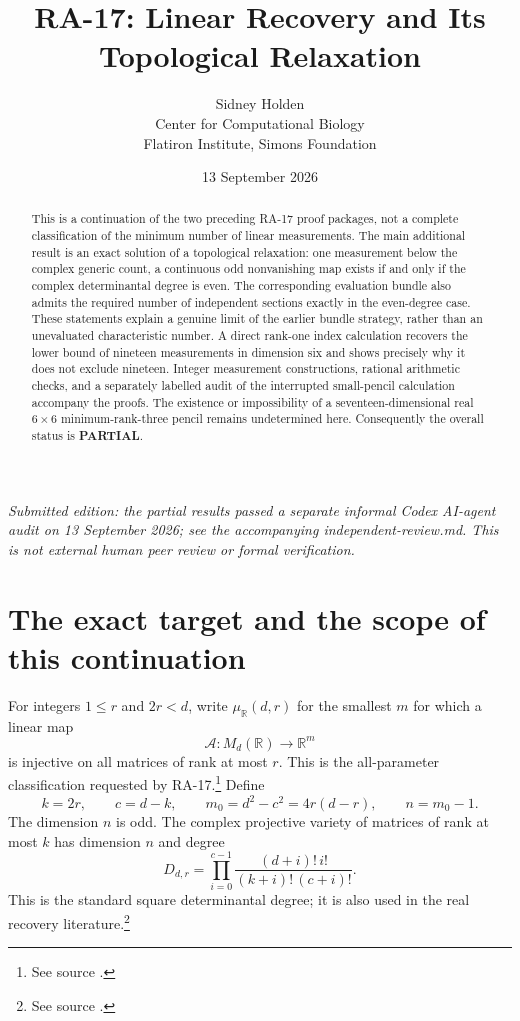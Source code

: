 \documentclass[11pt]{article}
\title{RA-17: Linear Recovery and Its Topological Relaxation}
\author{Sidney Holden\\{\small Center for Computational Biology}\\{\small Flatiron Institute, Simons Foundation}}\date{13 September 2026}
\theoremstyle{remark}\newtheorem{remark}[theorem]{Remark}
\newcommand{\R}{\mathbb R}\newcommand{\C}{\mathbb C}\newcommand{\Q}{\mathbb Q}
\newcommand{\fnref}[1]{\footnote{See source \cite{#1}.}}
\begin{document}
\maketitle
\noindent\textit{Submitted edition: the partial results passed a separate informal Codex AI-agent audit on 13 September 2026; see the accompanying independent-review.md. This is not external human peer review or formal verification.}

\begin{abstract}
This is a continuation of the two preceding RA-17 proof packages, not a complete
classification of the minimum number of linear measurements. The main additional
result is an exact solution of a topological relaxation: one measurement below the
complex generic count, a continuous odd nonvanishing map exists if and only if the
complex determinantal degree is even. The corresponding evaluation bundle also
admits the required number of independent sections exactly in the even-degree case.
These statements explain a genuine limit of the earlier bundle strategy, rather
than an unevaluated characteristic number. A direct rank-one index calculation
recovers the lower bound of nineteen measurements in dimension six and shows
precisely why it does not exclude nineteen. Integer measurement constructions,
rational arithmetic checks, and a separately labelled audit of the interrupted
small-pencil calculation accompany the proofs. The existence or impossibility of
a seventeen-dimensional real $6\times6$ minimum-rank-three pencil remains
undetermined here. Consequently the overall status is \textbf{PARTIAL}.
\end{abstract}
\tableofcontents

\section{The exact target and the scope of this continuation}
For integers $1\le r$ and $2r<d$, write $\mu_\R(d,r)$ for the smallest $m$ for
which a linear map
\[
\mathcal A:M_d(\R)\longrightarrow\R^m
\]
is injective on all matrices of rank at most $r$. This is the all-parameter
classification requested by RA-17.\fnref{ra17} Define
\[
 k=2r,\qquad c=d-k,\qquad m_0=d^2-c^2=4r(d-r),\qquad n=m_0-1.
\]
The dimension $n$ is odd. The complex projective variety of matrices of rank at
most $k$ has dimension $n$ and degree
\begin{equation}\label{degree}
 D_{d,r}=\prod_{i=0}^{c-1}
 \frac{(d+i)!\,i!}{(k+i)!\,(c+i)!}.
\end{equation}
This is the standard square determinantal degree; it is also used in the real
recovery literature.\fnref{xu}
\end{document}
